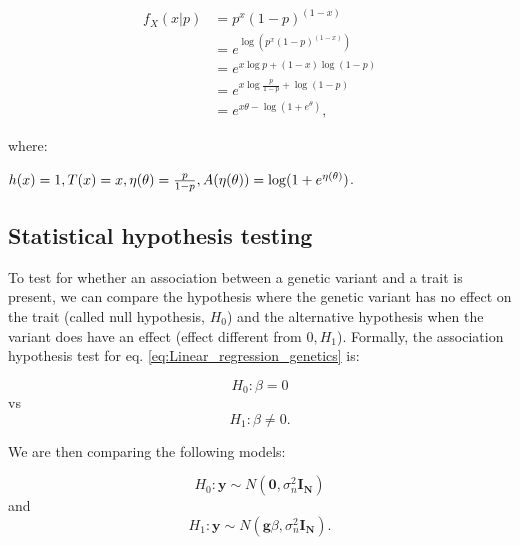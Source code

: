 \begin{Comment}
\begin{equation*}
\begin{split}
    f_X(x|p) & = p^x(1-p)^{(1-x)}\\
         & = e^{\log (p^x(1-p)^{(1-x)})}\\
         & = e^{x\log p + (1-x)\log (1-p)}\\
         & = e^{x\log \frac{p}{1-p}+\log (1-p)}\\
         & = e^{x\theta - \log (1+e^\theta)},
\end{split}
\end{equation*}

where: 

\hfill $h(x)=1, \hfill T(x)=x, \hfill \eta(\theta) = \frac{p}{1-p}, \hfill A(\eta(\theta)) = \log (1+e^{\eta(\theta)})$. \hfill

\end{Comment}


\newpage

\subsection{Statistical hypothesis testing}
\label{sec:hypothesis_testing}

To test for whether an association between a genetic variant and a trait is present, we can compare the hypothesis where the genetic variant has no effect on the trait (called null hypothesis, $H_0$) and the alternative hypothesis when the variant does have an effect (effect different from $0, H_1$).
Formally, the association hypothesis test for eq. \eqref{eq:Linear_regression_genetics} is:

\begin{equation}\label{eq:null_hypothesis}
 H_{0}: \beta=0 
\end{equation}
vs
\begin{equation}\label{eq:alternative_hypothesis}
 H_{1}: \beta \neq 0. 
\end{equation}

\vspace{4mm}

We are then comparing the following models:

\begin{equation}\label{eq:null_hypothesis_regression}
 H_0: \mathbf{y} \sim N(\mathbf{0}, \sigma_n^{2} \mathbf{I_N}) 
\end{equation}
and
\begin{equation}\label{eq:alternative_hypothesis_regression}
 H_1: \mathbf{y} \sim N(\mathbf{g}\beta,\sigma_n^{2} \mathbf{I_N}). 
\end{equation}

